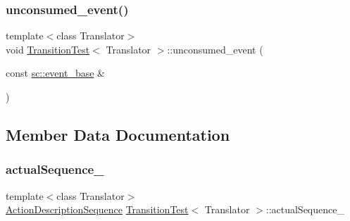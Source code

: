 \mbox{\label{struct_transition_test_a571199fb1d7484cd8a9e575b9524e92f}} 
\subsubsection{\texorpdfstring{unconsumed\+\_\+event()}{unconsumed\_event()}}
{\footnotesize\ttfamily template$<$class Translator$>$ \\
void \mbox{\hyperlink{struct_transition_test}{Transition\+Test}}$<$ Translator $>$\+::unconsumed\+\_\+event (\begin{DoxyParamCaption}\item[{const \mbox{\hyperlink{classboost_1_1statechart_1_1event__base}{sc\+::event\+\_\+base}} \&}]{ }\end{DoxyParamCaption})\hspace{0.3cm}{\ttfamily [inline]}}



\subsection{Member Data Documentation}
\mbox{\label{struct_transition_test_a224815ec84366d59a1265a4dd87f9fbb}} 
\subsubsection{\texorpdfstring{actual\+Sequence\+\_\+}{actualSequence\_}}
{\footnotesize\ttfamily template$<$class Translator$>$ \\
\mbox{\hyperlink{_transition_test_8cpp_a3a9d02400db74004cfbb7c1777a1e17a}{Action\+Description\+Sequence}} \mbox{\hyperlink{struct_transition_test}{Transition\+Test}}$<$ Translator $>$\+::actual\+Sequence\+\_\+\hspace{0.3cm}{\ttfamily [private]}}

\mbox{\label{struct_transition_test_a7f392f4d108f5d692be49186b9d1c6e1}} 

